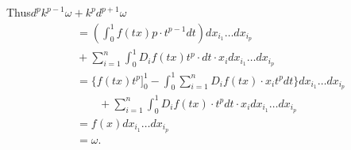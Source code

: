 Thus\pageoriginale $ d^p k^{p-1} \omega + k^p d^{p+1} \omega $ 
\begin{align*}
& = ( \int^1_0 f(tx) p \cdot t^{p-1} dt ) dx_{i_{1}} \dots dx_{i_{p}}\\
& {} +  \sum^n_{i=1}  \int^1_0 D_i f (tx) t^p \cdot dt \cdot x_i dx_{i_{1}} \dots
  dx_{i_{p}}\\ 
& = \bigg\{ f (tx) t^p  \bigg]^1_0 - \int^1_0 \sum^{n}_{i = 1} D_i f
    (tx)\cdot x_i t^p dt \bigg\} dx_{i_{1}} \dots dx_{i_{p}}\\ 
& \qquad + \sum^n_{i=1} \int^1_0  D_i f (tx)\cdot t^p dt \cdot  x_i
    dx_{i_{1}} \dots     dx_{i_{p}} \\ 
&=  f(x) dx_{i_{1}} \dots dx_{i_{p}} \\
&= \omega .
 \end{align*} 
 

